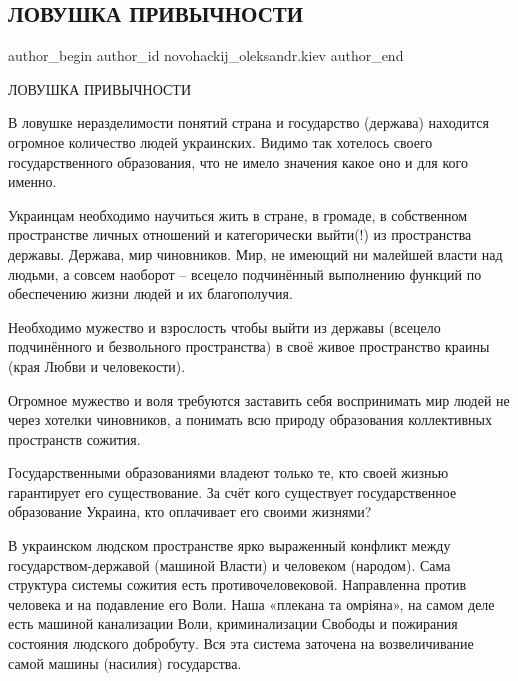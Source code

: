  
 
 
 
 
 
\subsection{ЛОВУШКА ПРИВЫЧНОСТИ}
\label{sec:29_01_2022.fb.novohackij_oleksandr.kiev.1.lovushka_privychnosti}
 
\ifcmt
 author_begin
   author_id novohackij_oleksandr.kiev
 author_end
\fi

ЛОВУШКА ПРИВЫЧНОСТИ

В ловушке неразделимости понятий страна и государство (держава) находится
огромное количество людей украинских. Видимо так хотелось своего
государственного образования, что не имело значения какое оно и для кого
именно.

Украинцам необходимо научиться жить в стране, в громаде, в собственном
пространстве личных отношений и категорически выйти(!) из пространства державы.
Держава, мир чиновников. Мир, не имеющий ни малейшей власти над людьми, а
совсем наоборот – всецело подчинённый выполнению функций по обеспечению жизни
людей и их благополучия.

Необходимо мужество и взрослость чтобы выйти из державы (всецело подчинённого и
безвольного пространства) в своё живое пространство краины (края Любви и
человекости). 

Огромное мужество и воля требуются заставить себя воспринимать мир людей не
через хотелки чиновников, а понимать всю природу образования коллективных
пространств сожития.

Государственными образованиями владеют только те, кто своей жизнью гарантирует
его существование. За счёт кого существует государственное образование Украина,
кто оплачивает его своими жизнями?

В украинском людском пространстве ярко выраженный конфликт между
государством-державой (машиной Власти) и человеком (народом). Сама структура
системы сожития есть противочеловековой. Направленна против человека и на
подавление его Воли. Наша «плекана та омріяна», на самом деле есть машиной
канализации Воли, криминализации Свободы и пожирания состояния людского
добробуту. Вся эта система заточена на возвеличивание самой машины (насилия)
государства.

